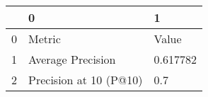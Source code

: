 \begin{tabular}{lll}
\toprule
{} &                       0 &         1 \\
\midrule
0 &                  Metric &     Value \\
1 &       Average Precision &  0.617782 \\
2 &  Precision at 10 (P@10) &       0.7 \\
\bottomrule
\end{tabular}
